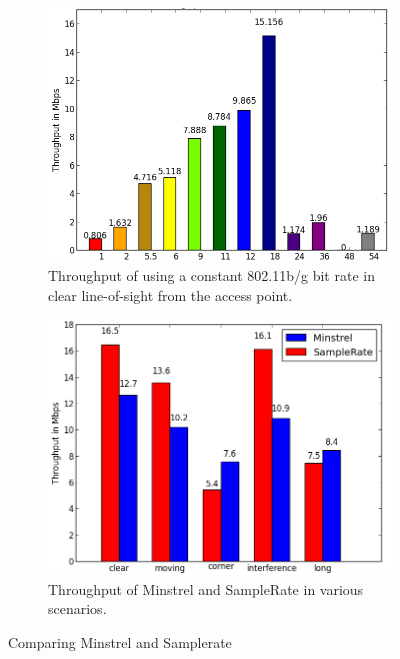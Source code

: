 \documentclass[twocolumn,10pt]{article}
\begin{document}
\begin{figure}[htbp]
  \centering
  \begin{subfigure}{.45\linewidth}
    \includegraphics[width=\linewidth]{constant.png}
    \caption{Throughput of using a constant 802.11b/g bit rate in
      clear line-of-sight from the access point.}
    \label{figure:2}
  \end{subfigure}\hfill
  \begin{subfigure}{.45\linewidth}
    \includegraphics[width=\linewidth]{MinVSSam1.png}
    \caption{Throughput of Minstrel and SampleRate in various
      scenarios.}
    \label{figure:3}
  \end{subfigure}
  \caption{Comparing Minstrel and Samplerate}
\end{figure}
\end{document}
